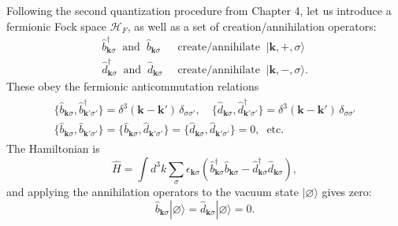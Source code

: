 \documentclass[prx,12pt]{revtex4-2}
\begin{document}
Following the second quantization procedure from Chapter 4, let us
introduce a fermionic Fock space $\mathscr{H}_F$, as well as a set of
creation/annihilation operators:
\begin{align*}
  \hat{b}_{\mathbf{k}\sigma}^\dagger \;\; \mathrm{and} \;\; \hat{b}_{\mathbf{k}\sigma}
  &\;\;\mathrm{create/annihilate} \;\; |\mathbf{k}, +, \sigma\rangle\\
  \hat{d}_{\mathbf{k}\sigma}^\dagger \;\; \mathrm{and} \;\; \hat{d}_{\mathbf{k}\sigma}
  &\;\;\mathrm{create/annihilate} \;\; |\mathbf{k}, -, \sigma\rangle.
\end{align*}
These obey the fermionic anticommutation relations
\begin{align}
  \begin{aligned}
    \{\hat{b}_{\mathbf{k}\sigma}, \hat{b}_{\mathbf{k}'\sigma'}^\dagger \}
    = \delta^3(\mathbf{k}-\mathbf{k}') \, \delta_{\sigma\sigma'}, \quad
    \{\hat{d}_{\mathbf{k}\sigma}, \hat{d}_{\mathbf{k}'\sigma'}^\dagger \}
    = \delta^3(\mathbf{k}-\mathbf{k}') \, \delta_{\sigma\sigma'} \\
    \{\hat{b}_{\mathbf{k}\sigma}, \hat{b}_{\mathbf{k}'\sigma'} \} = 
    \{\hat{b}_{\mathbf{k}\sigma}, \hat{d}_{\mathbf{k}'\sigma'} \} = 
    \{\hat{d}_{\mathbf{k}\sigma}, \hat{d}_{\mathbf{k}'\sigma'} \} = 0, \;\;\textrm{etc.}
  \end{aligned}
  \label{Diracanticommutation0}
\end{align}
The Hamiltonian is
\begin{equation}
  \hat{H} = \int d^3k \sum_\sigma \epsilon_{\mathbf{k}\sigma} \left(
  \hat{b}^\dagger_{\mathbf{k}\sigma} \hat{b}_{\mathbf{k}\sigma}
  - \hat{d}^\dagger_{\mathbf{k}\sigma} \hat{d}_{\mathbf{k}\sigma}
  \right),
  \label{HDiracQFT0}
\end{equation}
and applying the annihilation operators to the vacuum state
$|\varnothing\rangle$ gives zero:
\begin{equation}
  \hat{b}_{\mathbf{k}\sigma} |\varnothing\rangle =
  \hat{d}_{\mathbf{k}\sigma} |\varnothing\rangle = 0.
\end{equation}
\end{document}
